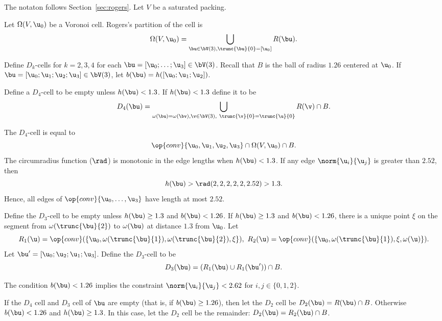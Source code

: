 The notaton follows Section~\ref{sec:rogers}.  Let $V$ be a saturated
packing.

Let $\Omega( V,\u_0)$ be a Voronoi cell.  Rogers's partition of the cell
is
\[
\Omega(V, \u_0) = \bigcup_{ \bu\in  \bV(3), \trunc{\bu}{0}= [\u_0] } R( \bu).
\]
%
%


Define $D_k$-cells for $k=2,3,4$ for each $ \bu=[\u_0;\ldots;\u_3]\in
\bV(3)$.  Recall that $B$ is the ball of radius $1.26$ centered at $
\u_0$.  If $\bu =[\u_0;\u_1;\u_2;\u_3]\in \bV(3)$, let $b(\bu) = h([
\u_0; \u_1; \u_2])$.  %
%

\begin{definition}[$D_4$]
  Define a $D_4$-cell to be empty unless $h(\bu)<1.3$.  If
  $h(\bu)<1.3$ define it to be
\[
  D_4(\bu)=\bigcup_{\omega( \bu)
=\omega(\bv),  \v\in  \bV(3),\ \trunc{\v}{0}= \trunc{\u}{0}}  R(\v)\cap B.
\]
%
\end{definition}

The $D_4$-cell is equal to
\[
  \op{conv}\{ \u_0, \u_1, \u_2, \u_3\} \cap \Omega(V, \u_0)\cap B.
\]
The circumradius function ($\rad$) is monotonic in the edge lengths
when $h(\bu)<1.3$.  If any edge $\norm{ \u_i}{ \u_j}$ is greater than
$2.52$, then
\[
h(\bu) > \rad(2,2,2,2,2,2.52) > 1.3.
\]  
Hence, all edges of $\op{conv}\{\u_0,\ldots,\u_3\}$ have length at most
$2.52$.

\begin{definition}[$D_3$]
  Define the $D_3$-cell to be empty unless $h(\bu)\ge 1.3$ and
  $b(\bu)< 1.26$.  If $h(\bu) \ge 1.3$ and $b(\bu)< 1.26$, there is a
  unique point $\xi$ on the segment from $\omega( \trunc{\bu}{2})$ to
  $\omega(\bu)$ at distance  $1.3$ from $ \u_0$.  Let
\[
  R_1( \u) = \op{conv}(\{ \u_0,\omega( \trunc{\bu}{1}),\omega( \trunc{\bu}{2}),\xi\} ),\ 
  R_2( \u) = \op{conv}(\{ \u_0,\omega( \trunc{\bu}{1}),\xi,\omega( \u)\} ).
\]
Let $ \bu' = [ \u_0; \u_2; \u_1; \u_3]$.
Define the $D_3$-cell to be
\[
D_3(\bu) = (R_1( \bu) \cup R_1( \bu'))\cap B.
\]
\end{definition}

The condition $b(\bu)< 1.26$ implies the constraint $\norm{ \u_i}{
  \u_j}< 2.62$ for $i,j\in\{0,1,2\}$.

\begin{definition}[$D_2$]
  If the $D_4$ cell and $D_3$ cell of $\bu$ are empty (that is, if
  $b(\bu)\ge 1.26$), then let the $D_2$ cell be $D_2(\bu)=R(\bu)\cap
  B$.  Otherwise $b(\bu)< 1.26$ and $h(\bu) \ge 1.3$.  In this case,
  let the $D_2$ cell be the remainder: $D_2(\bu)=R_2(\bu)\cap B$.
\end{definition}

